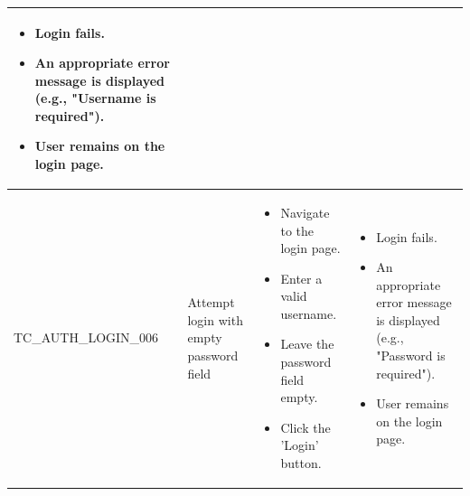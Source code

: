 \documentclass[10pt, a4paper]{report}
\begin{document}
\begin{longtable}{|>{\raggedright\arraybackslash}p{4cm}|>{\raggedright\arraybackslash}p{4cm}|>{\raggedright\arraybackslash}p{5cm}|>{\raggedright\arraybackslash}p{5cm}|}
\begin{itemize}[noitemsep, topsep=0pt, partopsep=0pt, leftmargin=*]
        \item Login fails.
        \item An appropriate error message is displayed (e.g., "Username is required").
        \item User remains on the login page.
    \end{itemize} \\ \hline
TC\_AUTH\_LOGIN\_006 & Attempt login with empty password field & 
    \begin{itemize}[noitemsep, topsep=0pt, partopsep=0pt, leftmargin=*]
        \item Navigate to the login page.
        \item Enter a valid username.
        \item Leave the password field empty.
        \item Click the 'Login' button.
    \end{itemize} & 
    \begin{itemize}[noitemsep, topsep=0pt, partopsep=0pt, leftmargin=*]
        \item Login fails.
        \item An appropriate error message is displayed (e.g., "Password is required").
        \item User remains on the login page.
    \end{itemize} \\ \hline


\end{longtable}
\end{document}

